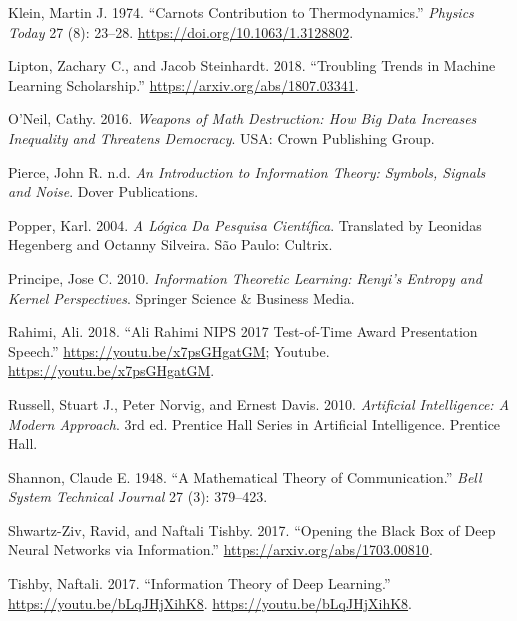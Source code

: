 \documentclass[
  letterpaper,
]{tufte-book}
\newlength{\cslhangindent}
\newlength{\cslentryspacingunit} %
\newenvironment{CSLReferences}[2] %
 {%
  \setlength{\parindent}{0pt}
  \ifodd #1
  \let\oldpar\par
  \def\par{\hangindent=\cslhangindent\oldpar}
  \fi
  \setlength{\parskip}{#2\cslentryspacingunit}
 }%
 {}
\begin{document}
\begin{CSLReferences}{1}{0}
\leavevmode{}%
Klein, Martin J. 1974. {``Carnot{\textquotesingle}s Contribution to
Thermodynamics.''} \emph{Physics Today} 27 (8): 23--28.
\url{https://doi.org/10.1063/1.3128802}.

\leavevmode{}%
Lipton, Zachary C., and Jacob Steinhardt. 2018. {``Troubling Trends in
Machine Learning Scholarship.''} \url{https://arxiv.org/abs/1807.03341}.

\leavevmode{}%
O'Neil, Cathy. 2016. \emph{Weapons of Math Destruction: How Big Data
Increases Inequality and Threatens Democracy}. USA: Crown Publishing
Group.

\leavevmode{}%
Pierce, John R. n.d. \emph{An Introduction to Information Theory:
Symbols, Signals and Noise}. Dover Publications.

\leavevmode{}%
Popper, Karl. 2004. \emph{A Lógica Da Pesquisa Científica}. Translated
by Leonidas Hegenberg and Octanny Silveira. São Paulo: Cultrix.

\leavevmode{}%
Principe, Jose C. 2010. \emph{Information Theoretic Learning: Renyi's
Entropy and Kernel Perspectives}. Springer Science \& Business Media.

\leavevmode{}%
Rahimi, Ali. 2018. {``Ali Rahimi NIPS 2017 Test-of-Time Award
Presentation Speech.''} \url{https://youtu.be/x7psGHgatGM}; Youtube.
\url{https://youtu.be/x7psGHgatGM}.

\leavevmode{}%
Russell, Stuart J., Peter Norvig, and Ernest Davis. 2010.
\emph{Artificial Intelligence: A Modern Approach}. 3rd ed. Prentice
{{Hall} } Series in Artificial Intelligence. Prentice Hall.

\leavevmode{}%
Shannon, Claude E. 1948. {``A Mathematical Theory of Communication.''}
\emph{Bell System Technical Journal} 27 (3): 379--423.

\leavevmode{}%
Shwartz-Ziv, Ravid, and Naftali Tishby. 2017. {``Opening the Black Box
of Deep Neural Networks via Information.''}
\url{https://arxiv.org/abs/1703.00810}.

\leavevmode{}%
Tishby, Naftali. 2017. {``Information Theory of Deep Learning.''}
\url{https://youtu.be/bLqJHjXihK8}. \url{https://youtu.be/bLqJHjXihK8}.


\end{CSLReferences}
\end{document}
